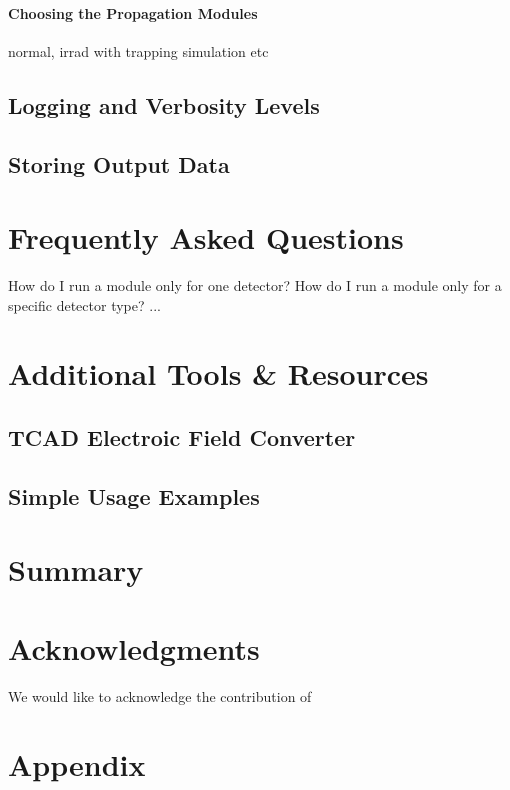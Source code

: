\documentclass{scrartcl}
\begin{document}
\paragraph{Choosing the Propagation Modules}
normal, irrad with trapping simulation etc
\subsection{Logging and Verbosity Levels}
\subsection{Storing Output Data}

\section{Frequently Asked Questions}
How do I run a module only for one detector?
How do I run a module only for a specific detector type?
...

\section{Additional Tools \& Resources}
\subsection{TCAD Electroic Field Converter}
\subsection{Simple Usage Examples}

\section{Summary}

\section{Acknowledgments}
We would like to acknowledge the contribution of


\section{Appendix}

\clearpage



\clearpage
{}
{}
\begin{thebibliography}{99}
  
\end{thebibliography}
\end{document}
